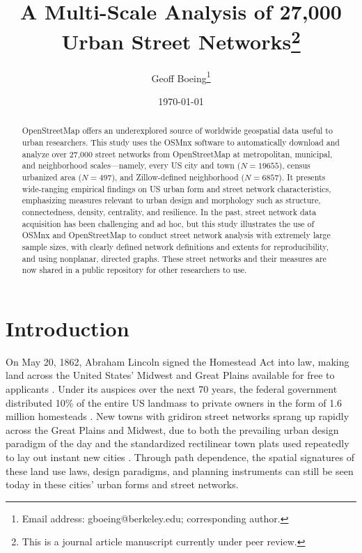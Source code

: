 \documentclass{article}
\begin{document}
\title{A Multi-Scale Analysis of 27,000 Urban Street Networks\footnote{This is a journal article manuscript currently under peer review.}}
\author{Geoff Boeing\footnote{Email address: gboeing@berkeley.edu; corresponding author.}}
\date{\today}
\maketitle



\begin{abstract}
	
OpenStreetMap offers an underexplored source of worldwide geospatial data useful to urban researchers. This study uses the OSMnx software to automatically download and analyze over 27,000 street networks from OpenStreetMap at metropolitan, municipal, and neighborhood scales---namely, every US city and town ($N=19655$), census urbanized area ($N=497$), and Zillow-defined neighborhood ($N=6857$). It presents wide-ranging empirical findings on US urban form and street network characteristics, emphasizing measures relevant to urban design and morphology such as structure, connectedness, density, centrality, and resilience. In the past, street network data acquisition has been challenging and ad hoc, but this study illustrates the use of OSMnx and OpenStreetMap to conduct street network analysis with extremely large sample sizes, with clearly defined network definitions and extents for reproducibility, and using nonplanar, directed graphs. These street networks and their measures are now shared in a public repository for other researchers to use.

\end{abstract}



\section{Introduction}

On May 20, 1862, Abraham Lincoln signed the Homestead Act into law, making land across the United States' Midwest and Great Plains available for free to applicants \cite{porterfield_homestead_2005}. Under its auspices over the next 70 years, the federal government distributed 10\% of the entire US landmass to private owners in the form of 1.6 million homesteads \cite{lee_kansas_1979, sherraden_inclusion_2005}. New towns with gridiron street networks sprang up rapidly across the Great Plains and Midwest, due to both the prevailing urban design paradigm of the day and the standardized rectilinear town plats used repeatedly to lay out instant new cities \cite{southworth_streets_1997}. Through path dependence, the spatial signatures of these land use laws, design paradigms, and planning instruments can still be seen today in these cities' urban forms and street networks.
\end{document}
